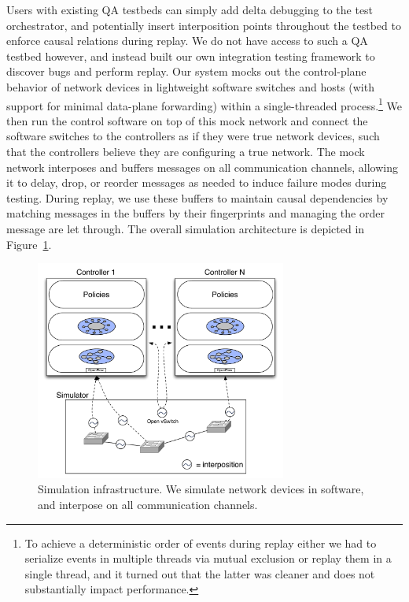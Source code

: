 Users with existing
QA testbeds can simply add delta debugging to the test
orchestrator, and potentially insert interposition points throughout the
testbed to enforce causal relations during replay.
We do not have access to such a QA testbed however, and instead built our own
integration testing framework to discover bugs and
perform replay. Our system mocks out the control-plane
behavior of network devices in lightweight software switches and hosts (with
support for minimal data-plane forwarding)
within a single-threaded process.\footnote{To achieve a deterministic order of
events during replay either we had to serialize events in multiple threads via
mutual exclusion or replay them in a single thread, and it turned out that
the latter was cleaner and does not substantially impact performance.} We then run the control software on
top of this mock network and connect the software switches to the controllers as if they were true
network devices, such that the controllers believe they are configuring a true
network. The mock network interposes and buffers messages on all communication
channels, allowing it to delay, drop, or reorder
messages as needed to induce failure modes during testing. During
replay, we use these buffers to maintain causal dependencies by
matching messages in the buffers by their fingerprints and managing
the order message are let through. The overall simulation architecture is depicted in
Figure~\ref{fig:architecture}.

\begin{figure}[t]
    \includegraphics[width=3.25in]{../diagrams/architecture/Debugger_Architecture.pdf}
    \caption[]{\label{fig:architecture} Simulation infrastructure. We simulate
    network devices in software, and interpose on all communication
    channels.}
\end{figure}

